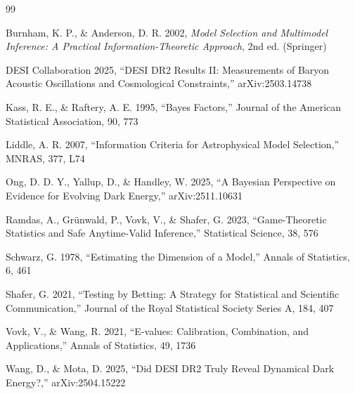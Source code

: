 \documentclass[11pt,a4paper]{article}
\begin{document}

\begin{thebibliography}{99}

Burnham, K. P., \& Anderson, D. R. 2002, \textit{Model Selection and Multimodel Inference: A Practical Information-Theoretic Approach}, 2nd ed. (Springer)

DESI Collaboration 2025, ``DESI DR2 Results II: Measurements of Baryon Acoustic Oscillations and Cosmological Constraints,'' arXiv:2503.14738

Kass, R. E., \& Raftery, A. E. 1995, ``Bayes Factors,'' Journal of the American Statistical Association, 90, 773

Liddle, A. R. 2007, ``Information Criteria for Astrophysical Model Selection,'' MNRAS, 377, L74

Ong, D. D. Y., Yallup, D., \& Handley, W. 2025, ``A Bayesian Perspective on Evidence for Evolving Dark Energy,'' arXiv:2511.10631

Ramdas, A., Gr{\"u}nwald, P., Vovk, V., \& Shafer, G. 2023, ``Game-Theoretic Statistics and Safe Anytime-Valid Inference,'' Statistical Science, 38, 576

Schwarz, G. 1978, ``Estimating the Dimension of a Model,'' Annals of Statistics, 6, 461

Shafer, G. 2021, ``Testing by Betting: A Strategy for Statistical and Scientific Communication,'' Journal of the Royal Statistical Society Series A, 184, 407

Vovk, V., \& Wang, R. 2021, ``E-values: Calibration, Combination, and Applications,'' Annals of Statistics, 49, 1736

Wang, D., \& Mota, D. 2025, ``Did DESI DR2 Truly Reveal Dynamical Dark Energy?,'' arXiv:2504.15222

\end{thebibliography}
\end{document}
